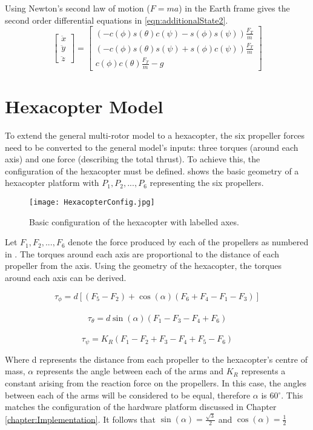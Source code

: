 Using Newton's second law of motion ($F=ma$) in the Earth frame gives the second order differential equations in \eqref{eqn:additionalState2}.\\
\begin{equation}\label{eqn:additionalState2}
\begin{bmatrix}
\ddot{x}\\\ddot{y}\\\ddot{z}
\end{bmatrix}
=
\begin{bmatrix}
(-c(\phi)s(\theta)c(\psi)-s(\phi)s(\psi))\frac{F_{T}}{m}\\
(-c(\phi)s(\theta)s(\psi)+s(\phi)c(\psi))\frac{F_{T}}{m}\\
c(\phi)c(\theta)\frac{F_{T}}{m}-g
\end{bmatrix}
\end{equation}

\section{Hexacopter Model}
To extend the general multi-rotor model to a hexacopter, the six propeller forces need to be converted to the general model's inputs: three torques (around each axis) and one force (describing the total thrust). To achieve this, the configuration of the hexacopter must be defined.  shows the basic geometry of a hexacopter platform with \(P_{1}, P_{2},...,P_{6}\) representing the six propellers. 

\begin{figure}[htb]
\begin{center}
	\texttt{[image: HexacopterConfig.jpg]}%
	\end{center}
	\caption{Basic configuration of the hexacopter with labelled axes.}%
	\label{fig:hex}%
\end{figure}


Let \(F_{1}, F_{2},...,F_{6}\) denote the force produced by each of the propellers as numbered in . The torques around each axis are proportional to the distance of each propeller from the axis. Using the geometry of the hexacopter, the torques around each axis can be derived.
\begin{flushleft}
\[\tau_{\phi}=d[(F_{5}-F_{2})+\cos(\alpha)(F_{6}+F_{4}-F_{1}-F_{3})]\]\\
\[\tau_{\theta}=d\sin(\alpha)(F_{1}-F_{3}-F_{4}+F_{6})\]\\
\[\tau_{\psi}=K_{R}(F_{1}-F_{2}+F_{3}-F_{4}+F_{5}-F_{6})\]
\end{flushleft}
Where d represents the distance from each propeller to the hexacopter's centre of mass, \(\alpha\) represents the angle between each of the arms and $K_{R}$ represents a constant arising from the reaction force on the propellers. In this case, the angles between each of the arms will be considered to be equal, therefore \(\alpha\) is 60\(^{\circ}\). This matches the configuration of the hardware platform discussed in Chapter \ref{chapter:Implementation}. It follows that \(\sin(\alpha)=\frac{\sqrt{3}}{2}\) and \(\cos(\alpha)=\frac{1}{2}\)\\


